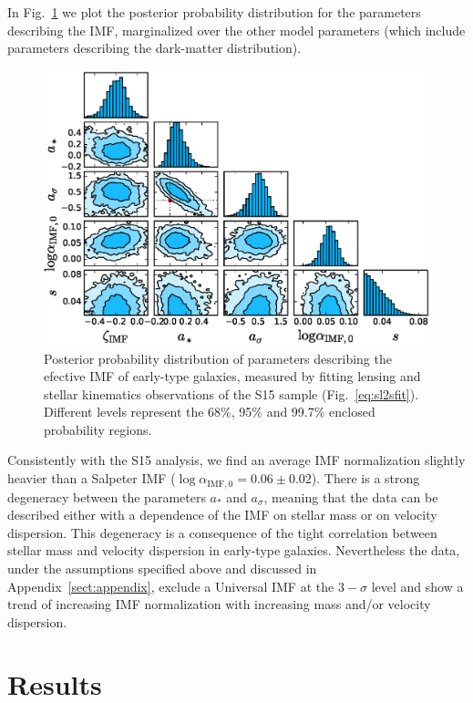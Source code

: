 \documentclass[usenatbib]{mnras}
\def\Fref#1{Fig.~\ref{#1}\xspace}
\begin{document}
In \Fref{fig:sl2scorner} we plot the posterior probability distribution for the parameters describing the IMF, marginalized over the other model parameters (which include parameters describing the dark-matter distribution).
%
\begin{figure}
 \includegraphics[width=\textwidth]{imf_pars_nfw_msps_sigma.eps}
 \caption{Posterior probability distribution of parameters describing
   the efective IMF of early-type galaxies, measured by fitting
   lensing and stellar kinematics observations of the S15 sample
   (\Fref{eq:sl2sfit}). Different levels represent the 68\%, 95\% and
   99.7\% enclosed probability regions.}
 \label{fig:sl2scorner}
\end{figure}
%
Consistently with the S15 analysis, we find an average IMF
normalization slightly heavier than a Salpeter IMF
($\log{\alpha_{\mathrm{IMF},0}} = 0.06\pm0.02$). There is a strong
degeneracy between the parameters $a_*$ and $a_\sigma$, meaning that
the data can be described either with a dependence of the IMF on
stellar mass or on velocity dispersion. This degeneracy is a
consequence of the tight correlation between stellar mass and velocity
dispersion in early-type galaxies.  Nevertheless the data, under the
assumptions specified above and discussed in
Appendix~\ref{sect:appendix}, exclude a Universal IMF at the
$3-\sigma$ level and show a trend of increasing IMF normalization with
increasing mass and/or velocity dispersion.


\section{Results}\label{sect:results}
\end{document}
